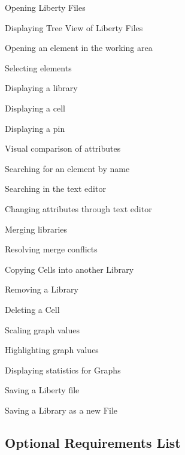 \documentclass[10pt,a4paper]{report}
\begin{document}
\begin{FR}
    \item Opening Liberty Files \label{FR-1}
    \item Displaying Tree View of Liberty Files \label{FR-2}
    \item Opening an element in the working area \label{FR-3}
    \item Selecting elements \label{FR-4.5}
    \item Displaying a library \label{FR-4.420/9}
    \item Displaying a cell \label{FR-47}
    \item Displaying a pin \label{FR-576476}
    \item Visual comparison of attributes \label{FR-34432} %
    \item Searching for an element by name \label{FR-15}
    \item Searching in the text editor \label{FR-SEARCH}
    \item Changing attributes through text editor \label{FR-11}
    \item Merging libraries \label{FR-6}
    \item Resolving merge conflicts \label{FR-7}
    \item Copying Cells into another Library\label{FR-8}
    \item Removing a Library \label{FR-9}
    \item Deleting a Cell \label{FR-10}
    \item Scaling graph values \label{FR-12}
    \item Highlighting graph values \label{FR-13}
    \item Displaying statistics for Graphs \label{FR-14}
    \item Saving a Liberty file \label{FR-16}
    \item Saving a Library as a new File \label{FR-17}
\end{FR}
\subsection{Optional Requirements List}
\end{document}
